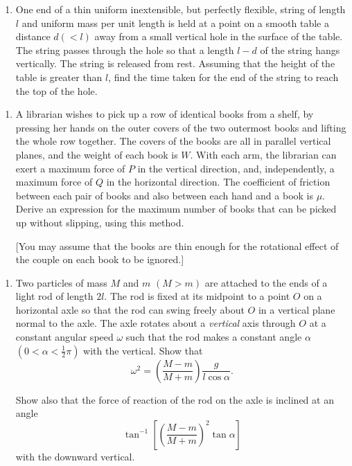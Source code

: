 \documentclass[a4, 11pt]{report}
\newlength{\qspace}
\newcounter{qnumber}
\newenvironment{question}%
 {\vspace{\qspace}
  \begin{enumerate}[\bfseries 1\quad][10]%
    \setcounter{enumi}{\value{qnumber}}%
    \item%
 }
{
  \end{enumerate}
  \filbreak
  \stepcounter{qnumber}
 }
\begin{document}
\begin{question}	
One end of a thin uniform inextensible, but perfectly flexible, string
of length $l$ and uniform mass per unit length is held at a point
on a smooth table a distance $d(<l)$ away from a small vertical hole
in the surface of the table. The string passes through the hole so
that a length $l-d$ of the string hangs vertically. The string is
released from rest. Assuming that the height of the table is greater
than $l$, find the time taken for the end of the string to reach
the top of the hole. 

\end{question}


\begin{question}
A librarian wishes to pick up a row of identical books from a shelf,
by pressing her hands on the outer covers of the two outermost books
and lifting the whole row together. The covers of the books are all
in parallel vertical planes, and the weight of each book is $W$.
With each arm, the librarian can exert a maximum force of $P$ in
the vertical direction, and, independently, a maximum force of $Q$
in the horizontal direction. The coefficient of friction between each
pair of books and also between each hand and a book is $\mu.$ Derive
an expression for the maximum number of books that can be picked up
without slipping, using this method. 


{[}You may assume that the books are thin enough for the rotational
effect of the couple on each book to be ignored.{]}
\end{question}
	
\begin{question}
Two particles of mass $M$ and $m$ $(M>m)$ are attached to the ends
of a light rod of length $2l.$ The rod is fixed at its midpoint to
a point $O$ on a horizontal axle so that the rod can swing freely
about $O$ in a vertical plane normal to the axle. The axle rotates
about a \textit{vertical }axis through $O$ at a constant angular
speed $\omega$ such that the rod makes a constant angle $\alpha$
$(0<\alpha<\frac{1}{2}\pi)$ with the vertical. Show that 
\[
\omega^{2}=\left(\frac{M-m}{M+m}\right)\frac{g}{l\cos\alpha}.
\]



Show also that the force of reaction of the rod on the axle is inclined
at an angle 
\[
\tan^{-1}\left[\left(\frac{M-m}{M+m}\right)^{2}\tan\alpha\right]
\]
with the downward vertical. 
\end{question}
	
\end{document}
